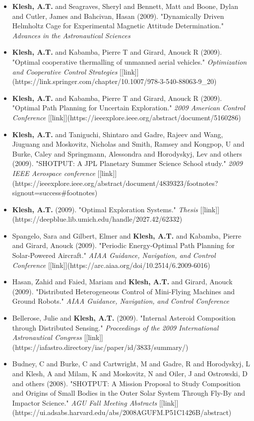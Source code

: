 \documentclass[11pt,letterpaper]{article}
\begin{document}
\begin{itemize}
\item \textbf{Klesh, A.T.} and Seagraves, Sheryl and Bennett, Matt and Boone, Dylan and Cutler, James and Bahcivan, Hasan (2009). "Dynamically Driven Helmholtz Cage for Experimental Magnetic Attitude Determination." \textit{Advances in the Astronautical Sciences}
\item \textbf{Klesh, A.T.} and Kabamba, Pierre T and Girard, Anouck R (2009). "Optimal cooperative thermalling of unmanned aerial vehicles." \textit{Optimization and Cooperative Control Strategies} [[link]](https://link.springer.com/chapter/10.1007/978-3-540-88063-9\_20)
\item \textbf{Klesh, A.T.} and Kabamba, Pierre T and Girard, Anouck R (2009). "Optimal Path Planning for Uncertain Exploration." \textit{2009 American Control Conference} [[link]](https://ieeexplore.ieee.org/abstract/document/5160286)
\item \textbf{Klesh, A.T.} and Taniguchi, Shintaro and Gadre, Rajeev and Wang, Jiuguang and Moskovitz, Nicholas and Smith, Ramsey and Kongpop, U and Burke, Caley and Springmann, Alessondra and Horodyskyj, Lev and others (2009). "SHOTPUT: A JPL Planetary Summer Science School study." \textit{2009 IEEE Aerospace conference} [[link]](https://ieeexplore.ieee.org/abstract/document/4839323/footnotes?signout=success\#footnotes)
\item \textbf{Klesh, A.T.} (2009). "Optimal Exploration Systems." \textit{Thesis} [[link]](https://deepblue.lib.umich.edu/handle/2027.42/62332)
\item Spangelo, Sara and Gilbert, Elmer and \textbf{Klesh, A.T.} and Kabamba, Pierre and Girard, Anouck (2009). "Periodic Energy-Optimal Path Planning for Solar-Powered Aircraft." \textit{AIAA Guidance, Navigation, and Control Conference} [[link]](https://arc.aiaa.org/doi/10.2514/6.2009-6016)
\item Hasan, Zahid and Faied, Mariam and \textbf{Klesh, A.T.} and Girard, Anouck (2009). "Distributed Heterogeneous Control of Mini-Flying Machines and Ground Robots." \textit{AIAA Guidance, Navigation, and Control Conference}
\item Bellerose, Julie and \textbf{Klesh, A.T.} (2009). "Internal Asteroid Composition through Distributed Sensing." \textit{Proceedings of the 2009 International Astronautical Congress} [[link]](https://iafastro.directory/iac/paper/id/3833/summary/)
\item Budney, C and Burke, C and Cartwright, M and Gadre, R and Horodyskyj, L and Klesh, A and Milam, K and Moskovitz, N and Oiler, J and Ostrowski, D and others (2008). "SHOTPUT: A Mission Proposal to Study Composition and Origins of Small Bodies in the Outer Solar System Through Fly-By and Impactor Science." \textit{AGU Fall Meeting Abstracts} [[link]](https://ui.adsabs.harvard.edu/abs/2008AGUFM.P51C1426B/abstract)

\end{itemize}
\end{document}
